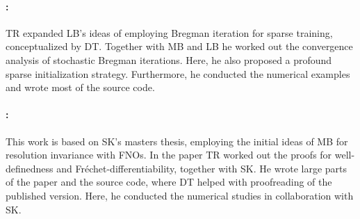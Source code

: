 \paragraph{\cite{bungert2022bregman}:} TR expanded LB's ideas of employing Bregman iteration for sparse training, conceptualized by DT. Together with MB and LB he worked out the convergence analysis of stochastic Bregman iterations. Here, he also proposed a profound sparse initialization strategy. Furthermore, he conducted the numerical examples and wrote most of the source code.

\paragraph{\cite{kabri2023resolution}:} This work is based on SK's masters thesis, employing the initial ideas of MB for resolution invariance with FNOs. In the paper TR worked out the proofs for well-definedness and Fréchet-differentiability, together with SK. He wrote large parts of the paper and the source code, where DT helped with proofreading of the published version. Here, he conducted the numerical studies in collaboration with SK.

